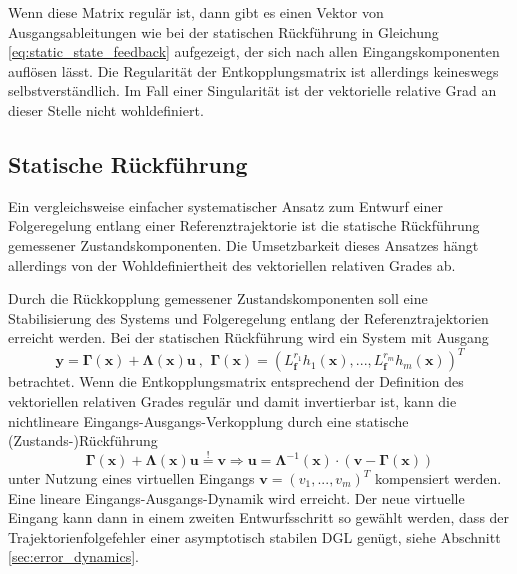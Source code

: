 Wenn diese Matrix regulär ist, dann gibt es einen Vektor von Ausgangsableitungen wie bei der statischen Rückführung in Gleichung \eqref{eq:static_state_feedback} aufgezeigt, der sich nach allen Eingangskomponenten auflösen lässt. Die Regularität der Entkopplungsmatrix ist allerdings keineswegs selbstverständlich. Im Fall einer Singularität ist der vektorielle relative Grad an dieser Stelle nicht wohldefiniert.

\subsection{Statische Rückführung}
\label{sec:static_state_feedback}
Ein vergleichsweise einfacher systematischer Ansatz zum Entwurf einer Folgeregelung entlang einer Referenztrajektorie ist die statische Rückführung gemessener Zustandskomponenten. Die Umsetzbarkeit dieses Ansatzes hängt allerdings von der Wohldefiniertheit des vektoriellen relativen Grades ab.

Durch die Rückkopplung gemessener Zustandskomponenten soll eine Stabilisierung des Systems und Folgeregelung entlang der Referenztrajektorien erreicht werden. Bei der statischen Rückführung wird ein System mit Ausgang
\begin{equation}
	\mathbf{y} = \boldsymbol{\Gamma}(\mathbf{x}) + \boldsymbol{\Lambda}(\mathbf{x}) \mathbf{u} \ \text{, } \ \boldsymbol{\Gamma}(\mathbf{x}) = (L_{\mathbf{f}}^{r_1} h_1(\mathbf{x}), ..., L_{\mathbf{f}}^{r_m} h_m(\mathbf{x}))^T
\end{equation}
betrachtet. Wenn die Entkopplungsmatrix entsprechend der Definition des vektoriellen relativen Grades regulär und damit invertierbar ist, kann die nichtlineare Eingangs-Ausgangs-Verkopplung durch eine statische (Zustands-)Rückführung
\begin{equation}
	\label{eq:static_state_feedback}
	\boldsymbol{\Gamma}(\mathbf{x}) + \boldsymbol{\Lambda}(\mathbf{x}) \mathbf{u} \stackrel{!}{=} \mathbf{v} \Rightarrow \mathbf{u} = \boldsymbol{\Lambda}^{-1}(\mathbf{x}) \cdot (\mathbf{v} - \boldsymbol{\Gamma}(\mathbf{x}))
\end{equation}
unter Nutzung eines virtuellen Eingangs $\mathbf{v} = (v_1, ..., v_m)^T$ kompensiert werden. Eine lineare Eingangs-Ausgangs-Dynamik wird erreicht. Der neue virtuelle Eingang kann dann in einem zweiten Entwurfsschritt so gewählt werden, dass der Trajektorienfolgefehler einer asymptotisch stabilen DGL genügt, siehe Abschnitt \ref{sec:error_dynamics}. \cite[S. 195]{NLRT_Roebenack}

